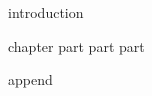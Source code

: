 \documentclass{claynote}
\begin{document}
\begin{void}
{

    \begin{pre}
        {introduction}
    \end{pre}

    \begin{body}
        {chapter}
        {part}
        {part}
        {part}
    \end{body}

    \begin{append}
        {append}
    \end{append}
}
\end{void}
\end{document}
